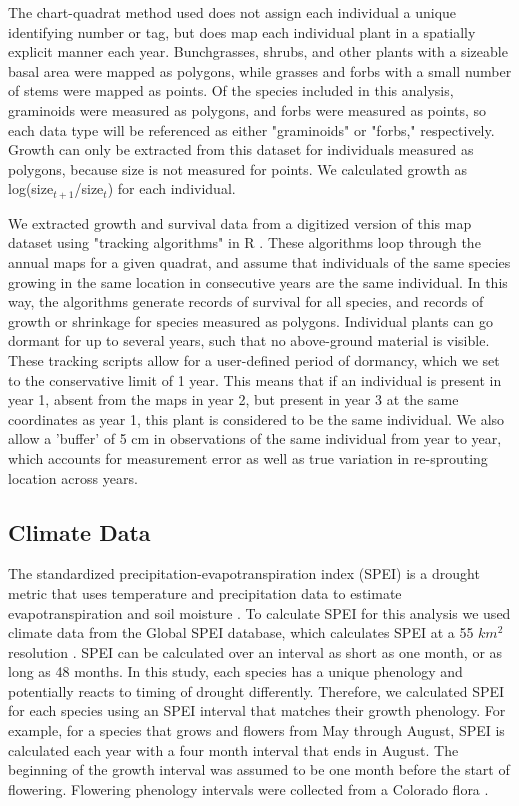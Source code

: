 \documentclass[12pt, letterpaper]{article}
\begin{document}
The chart-quadrat method used does not assign each individual a unique identifying number or tag, but does map each individual plant in a spatially explicit manner each year. Bunchgrasses, shrubs, and other plants with a sizeable basal area were mapped as polygons, while grasses and forbs with a small number of stems were mapped as points. Of the species included in this analysis, graminoids were measured as polygons, and forbs were measured as points, so each data type will be referenced as either "graminoids" or "forbs," respectively.  Growth can only be extracted from this dataset for individuals measured as polygons, because size is not measured for points. We calculated growth as log(size$_{t+1}$/size$_t$) for each individual.  

We extracted growth and survival data from a digitized version of this map dataset using "tracking algorithms" in R \citep{Lauenroth2008, RCoreTeam2019}. These algorithms loop through the annual maps for a given quadrat, and assume that individuals of the same species growing in the same location in consecutive years are the same individual. In this way, the algorithms generate records of survival for all species, and records of growth or shrinkage for species measured as polygons. Individual plants can go dormant for up to several years, such that no above-ground material is visible. These tracking scripts allow for a user-defined period of dormancy, which we set to the conservative limit of 1 year. This means that if an individual is present in year 1, absent from the maps in year 2, but present in year 3 at the same coordinates as year 1, this plant is considered to be the same individual. We also allow a 'buffer' of 5 cm in observations of the same individual from year to year, which accounts for measurement error as well as true variation in re-sprouting location across years. 
\subsection{Climate Data} The standardized precipitation-evapotranspiration index (SPEI) is a drought metric that uses temperature and precipitation data to estimate evapotranspiration and soil moisture \citep{Vicente-Serrano2010}.  To calculate SPEI for this analysis we used climate data from the Global SPEI database, which calculates SPEI at a 55 $km^2$ resolution \citep{Vicente-Serrano2010}. SPEI can be calculated over an interval as short as one month, or as long as 48 months. In this study, each species has a unique phenology and potentially reacts to timing of drought differently. Therefore, we calculated SPEI for each species using an SPEI interval that matches their growth phenology. For example, for a species that grows and flowers from May through August, SPEI is calculated each year with a four month interval that ends in August. The beginning of the growth interval was assumed to be one month before the start of flowering. Flowering phenology intervals were collected from a Colorado flora \citep{Ackerfield2015}.  
\end{document}
